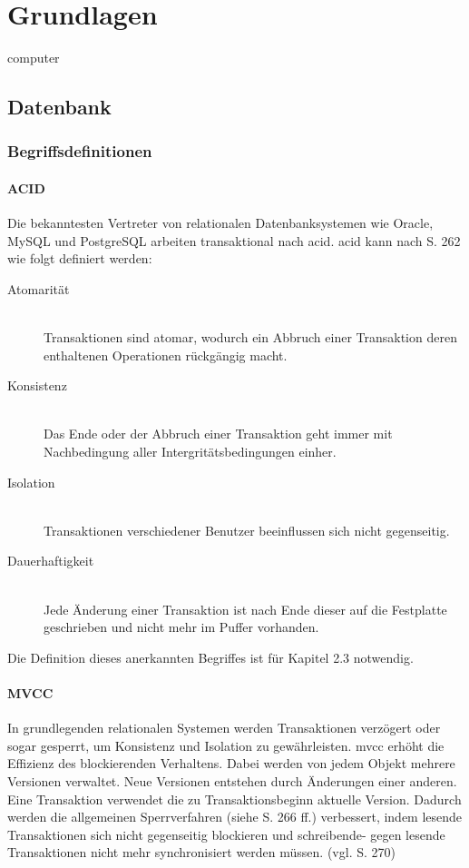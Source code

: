 \chapter{Grundlagen}
\Gls{computer}

\section{Datenbank}

\subsection{Begriffsdefinitionen}

\subsubsection{ACID}
Die bekanntesten Vertreter von relationalen Datenbanksystemen wie Oracle, MySQL und PostgreSQL arbeiten transaktional nach \Gls{acid}.
\Gls{acid} kann nach \cite{book:kudrass} S. 262 wie folgt definiert werden:
\begin{description}
\item[Atomarität] \hfill \\
Transaktionen sind atomar, wodurch ein Abbruch einer Transaktion deren enthaltenen Operationen rückgängig macht.
\item[Konsistenz] \hfill \\
Das Ende oder der Abbruch einer Transaktion geht immer mit Nachbedingung aller Intergritätsbedingungen einher.
\item[Isolation] \hfill \\
Transaktionen verschiedener Benutzer beeinflussen sich nicht gegenseitig.
\item[Dauerhaftigkeit] \hfill \\
Jede Änderung einer Transaktion ist nach Ende dieser auf die Festplatte geschrieben und nicht mehr im Puffer vorhanden.
\end{description}
Die Definition dieses anerkannten Begriffes ist für Kapitel 2.3 notwendig.

\subsubsection{MVCC}
In grundlegenden relationalen Systemen werden Transaktionen verzögert oder sogar gesperrt, um Konsistenz und Isolation zu gewährleisten.
\Gls{mvcc} erhöht die Effizienz des  blockierenden Verhaltens.
Dabei werden von jedem Objekt mehrere Versionen verwaltet.
Neue Versionen entstehen durch Änderungen einer anderen.
Eine Transaktion verwendet die zu Transaktionsbeginn aktuelle Version.
Dadurch werden die allgemeinen Sperrverfahren (siehe \cite{book:kudrass} S. 266 ff.) verbessert, indem lesende Transaktionen sich nicht gegenseitig blockieren und schreibende- gegen lesende Transaktionen nicht mehr synchronisiert werden müssen. (vgl. \cite{book:kudrass} S. 270)


